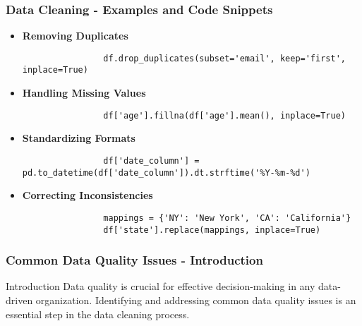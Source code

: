 \documentclass[aspectratio=169]{beamer}
\begin{document}
\begin{frame}[fragile]
    \frametitle{Data Cleaning - Examples and Code Snippets}
    \begin{itemize}
        \item \textbf{Removing Duplicates}
            \begin{lstlisting}
                df.drop_duplicates(subset='email', keep='first', inplace=True)
            \end{lstlisting}
        
        \item \textbf{Handling Missing Values}
            \begin{lstlisting}
                df['age'].fillna(df['age'].mean(), inplace=True)
            \end{lstlisting}
        
        \item \textbf{Standardizing Formats}
            \begin{lstlisting}
                df['date_column'] = pd.to_datetime(df['date_column']).dt.strftime('%Y-%m-%d')
            \end{lstlisting}
        
        \item \textbf{Correcting Inconsistencies}
            \begin{lstlisting}
                mappings = {'NY': 'New York', 'CA': 'California'}
                df['state'].replace(mappings, inplace=True)
            \end{lstlisting}
    \end{itemize}
\end{frame}

\begin{frame}[fragile]
    \frametitle{Common Data Quality Issues - Introduction}
    \begin{block}{Introduction}
        Data quality is crucial for effective decision-making in any data-driven organization. 
        Identifying and addressing common data quality issues is an essential step in the data cleaning process.
    \end{block}
\end{frame}
\end{document}

